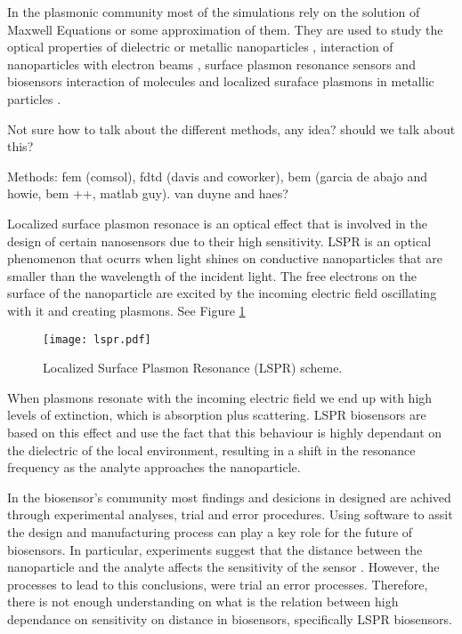 In the plasmonic community most of the simulations rely on the solution of 
Maxwell Equations or some approximation of them. They are used to study the 
optical properties of dielectric or metallic nanoparticles \cite{Hohenester2018,
JungPedersenSondergaardPedersenLarsenNielsen2010, VideenSun2003,
MayergoyzFredkinZhang2005, MayergoyzZhang2007}, interaction of nanoparticles
with electron beams \cite{GarciadeabajoAizpurua1997, GarciadeabajoHowie2002},
surface plasmon resonance sensors \cite{JungCampbellChinowskyMarYee1998} and
biosensors \cite{HaesETal2004, HaesVanduyne2002} interaction of molecules and
localized suraface plasmons in metallic particles \cite{DavisGomezVernon2010,
AntosiewiczApellClaudioKall2011}.

{\color{red} Not sure how to talk about the different methods, any idea? should
we talk about this? 

Methods: fem (comsol), fdtd (davis and coworker), bem (garcia de abajo and 
howie, bem ++, matlab guy). van duyne and haes? }

Localized surface plasmon resonace is an optical effect that is involved in the
design of certain nanosensors due to their high sensitivity. LSPR is an 
optical phenomenon that ocurrs when light shines on conductive nanoparticles
that are smaller than the wavelength of the incident light. The free electrons
on the surface of the nanoparticle are excited by the incoming electric field
oscillating with it and creating plasmons. See Figure \ref{fig:lspr}

\begin{figure}[h] %
   \centering
   \texttt{[image: lspr.pdf]} 
   \caption{Localized Surface Plasmon Resonance (LSPR) scheme. }
   \label{fig:lspr}
\end{figure}

When plasmons resonate with the incoming electric field we end up with high 
levels of extinction, which is absorption plus scattering. LSPR biosensors are 
based on this effect and use the fact that this behaviour is highly dependant
on the dielectric of the local environment, resulting in a shift in the 
resonance frequency as the analyte approaches the nanoparticle.  


In the biosensor's community most findings and desicions in designed are achived 
through experimental analyses, trial and error procedures. Using software to 
assit the design and manufacturing process can play a key role for the future
of biosensors. In particular, experiments suggest that the distance between the
nanoparticle and the analyte affects the sensitivity of the sensor
\cite{HaesETal2004}. However, the processes to lead to this conclusions, were 
trial an error processes. Therefore, there is not enough understanding on what 
is the relation between high dependance on sensitivity on distance in 
biosensors, specifically LSPR biosensors.

